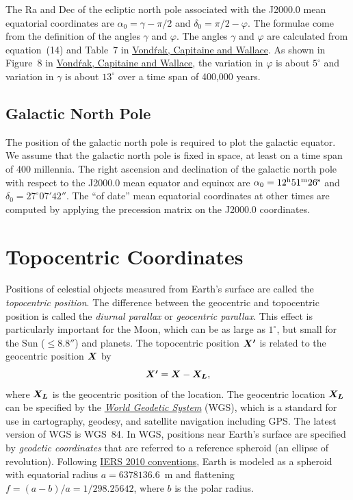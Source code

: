\documentclass[12pt]{article}
\newcommand \beq {\begin{equation}}
\newcommand \eeq {\end{equation}}
\newcommand{\ve}[1]{\mbox{\boldmath $#1$}}
\begin{document}
The Ra and Dec of the ecliptic north pole associated with the J2000.0 mean 
equatorial coordinates are $\alpha_0 = \gamma-\pi/2$ and $\delta_0=\pi/2 - \varphi$. 
The formulae come from the definition of the angles $\gamma$ and $\varphi$. 
The angles $\gamma$ and $\varphi$ are calculated from equation~(14) and Table~7 in 
\href{http://adsabs.harvard.edu/abs/2011A%26A...534A..22V}{Vond\'rak,
Capitaine and Wallace}. As shown in Figure~8 in 
\href{http://adsabs.harvard.edu/abs/2011A%26A...534A..22V}{Vond\'rak,
Capitaine and Wallace}, the variation in $\varphi$ is about $5^\circ$ and variation in 
$\gamma$ is about $13^\circ$ over a time span of 400,000 years.

\subsection{Galactic North Pole} 

The position of the galactic north pole is required to plot the galactic 
equator. We assume that the galactic north pole is fixed in space, at 
least on a time span of 400 millennia. The right ascension and declination 
of the galactic north pole with respect to the J2000.0 mean equator and equinox 
are $\alpha_0 = 12^{\rm h} 51^{\rm m} 26^{\rm s}$ and $\delta_0 = 27^\circ 07' 
42''$. The ``of date'' mean equatorial coordinates at other times are computed 
by applying the precession matrix on the J2000.0 coordinates.

\section{Topocentric Coordinates}

Positions of celestial objects measured from Earth's surface are called 
the {\em topocentric position}. The difference between the geocentric 
and topocentric position is called the {\em diurnal parallax} or 
{\em geocentric parallax}. This effect is particularly important for the Moon, 
which can be as large as $1^\circ$, but small for the Sun ($\leq 8.8''$) and planets. 
The topocentric position $\ve{X'}$ is related to the geocentric position $\ve{X}$ by 
\beq
  \ve{X'} = \ve{X} - \ve{X_L} ,
\label{eq:topoX}
\eeq
where $\ve{X_L}$ is the geocentric position of the location. The geocentric 
location $\ve{X_L}$ can be specified by the 
\href{https://en.wikipedia.org/wiki/World_Geodetic_System}{\em World Geodetic System} (WGS), 
which is a standard for use in cartography, geodesy, and satellite navigation including GPS. 
The latest version of WGS is WGS~84. 
In WGS, positions near Earth's surface are specified by {\em geodetic coordinates} 
that are referred to a reference spheroid (an ellipse of revolution). Following 
\href{https://www.iers.org/IERS/EN/Publications/TechnicalNotes/tn36.html}{IERS 2010 
conventions}, Earth is modeled as a spheroid with equatorial radius $a=6378136.6$~m 
and flattening $f=(a-b)/a=1/298.25642$, where $b$ is the polar radius.
\end{document}
